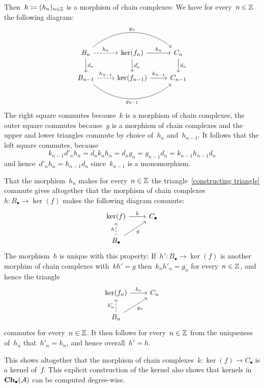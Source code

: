 Then~$h \coloneqq (h_n)_{n \in \mathbb{Z}}$ is a morphism of chain complexes: We have for every~$n \in \mathbb{Z}$ the following diagram:
\begin{equation}
  \label{cheese block}
  \begin{tikzcd}
      B_n
      \arrow[bend left = 40]{rr}[above]{g_n}
      \arrow[dashed]{r}[above]{h_n}
      \arrow{d}[right]{d_n}
    & \ker(f_n)
      \arrow{r}[above]{k_n}
      \arrow{d}[right]{d'_n}
    & C_n
      \arrow{d}[right]{d_n}
    \\
      B_{n-1}
      \arrow[dashed]{r}[above]{h_{n-1}}
      \arrow[bend right = 40]{rr}[below]{g_{n-1}}
    & \ker(f_{n-1})
      \arrow{r}[above]{k_{n-1}}
    & C_{n-1}
  \end{tikzcd}
\end{equation}
The right square commutes because~$k$ is a morphism of chain complexes, the outer square commutes because~$g$ is a morphism of chain complexes and the upper and lower triangles commute by choice of~$h_n$ and~$h_{n-1}$.
It follows that the left square commutes, because
\[
    k_{n-1} d'_n h_n
  = d_n k_n h_n
  = d_n g_n
  = g_{n-1} d_n
  = k_{n-1} h_{n-1} d_n
\]
and hence~$d'_n h_n = h_{n-1} d_n$ since~$k_{n-1}$ is a monomorphism.

That the morphism~$h_n$ makes for every~$n \in \mathbb{Z}$ the triangle~\eqref{constructing triangle} commute gives altogether that the morphism of chain complexes~$h \colon B_\bullet \to \ker(f)$ makes the following diagram commute:
\[
  \begin{tikzcd}
      \ker(f)
      \arrow{r}[above]{k}
    & C_\bullet
    \\
      B_\bullet
      \arrow[dashed]{u}[left]{h}
      \arrow{ur}[below right]{g}
    & {}
  \end{tikzcd}
\]
The morphism~$h$ is unique with this property:
If~$h' \colon B_\bullet \to \ker(f)$ is another morphim of chain complexes with~$k h' = g$ then~$k_n h'_n = g_n$ for every~$n \in \mathbb{Z}$, and hence the triangle
\[
  \begin{tikzcd}
      \ker(f_n)
      \arrow{r}[above]{k_n}
    & C_n
    \\
      B_n
      \arrow[dashed]{u}[left]{h'_n}
      \arrow{ur}[below right]{g_n}
    & {}
  \end{tikzcd}
\]
commutes for every~$n \in \mathbb{Z}$.
It then follows for every~$n \in \mathbb{Z}$ from the uniqueness of~$h_n$ that~$h'_n = h_n$, and hence overall~$h' = h$.

This shows altogether that the morphism of chain complexes~$k \colon \ker(f) \to C_\bullet$ is a kernel of~$f$.
This explicit construction of the kernel also shows that kernels in~$\mathbf{Ch}_\bullet(\mathcal{A})$ can be computed degree-wise.

